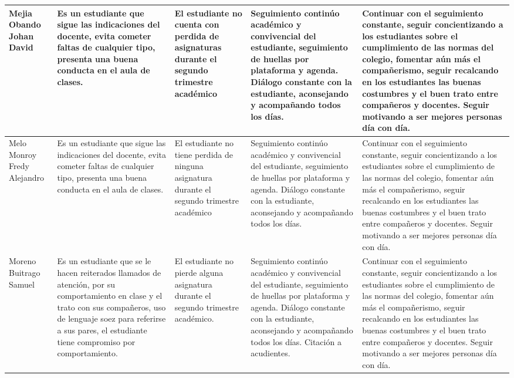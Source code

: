 \documentclass[spanish,11pt,a4paper]{article}
\begin{document}
\begin{longtable}{|p{3.5cm}|p{3.5cm}|p{3.5cm}|p{3.5cm}|p{3.5cm}|}
		Mejia Obando Johan David & 
		Es un estudiante que sigue las indicaciones del docente, evita cometer faltas de cualquier tipo, presenta una buena conducta en el aula de clases. & 
		El estudiante no cuenta con perdida de asignaturas durante el segundo trimestre académico & 
		Seguimiento continúo académico y convivencial del estudiante, seguimiento de huellas por plataforma y agenda. Diálogo constante con la estudiante, aconsejando y acompañando todos los días. & 
		Continuar con el seguimiento constante, seguir concientizando a los estudiantes sobre el cumplimiento de las normas del colegio, fomentar aún más el compañerismo, seguir recalcando en los estudiantes las buenas costumbres y el buen trato entre compañeros y docentes. Seguir motivando a ser mejores personas día con día.\\
		\hline
		
		Melo Monroy Fredy Alejandro & 
		Es un estudiante que sigue las indicaciones del docente, evita cometer faltas de cualquier tipo, presenta una buena conducta en el aula de clases. & 
		El estudiante no tiene perdida de ninguna asignatura durante el segundo trimestre académico& 
		Seguimiento continúo académico y convivencial del estudiante, seguimiento de huellas por plataforma y agenda. Diálogo constante con la estudiante, aconsejando y acompañando todos los días. & 
		Continuar con el seguimiento constante, seguir concientizando a los estudiantes sobre el cumplimiento de las normas del colegio, fomentar aún más el compañerismo, seguir recalcando en los estudiantes las buenas costumbres y el buen trato entre compañeros y docentes. Seguir motivando a ser mejores personas día con día.\\
		\hline
		
		Moreno Buitrago Samuel & 
		Es un estudiante que se le hacen reiterados llamados de atención, por su comportamiento en clase y el trato con sus compañeros, uso de lenguaje soez para referirse a sus pares, el estudiante tiene compromiso por comportamiento. & 
		El estudiante no pierde alguna asignatura durante el segundo trimestre académico. & 
		Seguimiento continúo académico y convivencial del estudiante, seguimiento de huellas por plataforma y agenda. Diálogo constante con la estudiante, aconsejando y acompañando todos los días. Citación a acudientes. & 
		Continuar con el seguimiento constante, seguir concientizando a los estudiantes sobre el cumplimiento de las normas del colegio, fomentar aún más el compañerismo, seguir recalcando en los estudiantes las buenas costumbres y el buen trato entre compañeros y docentes. Seguir motivando a ser mejores personas día con día.\\
		\hline
		

\end{longtable}
\end{document}
